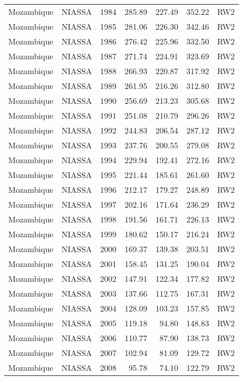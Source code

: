 \begin{longtable}{lllrrrl}
  Mozambique & NIASSA & 1984 & 285.89 & 227.49 & 352.22 & RW2 \\ 
  Mozambique & NIASSA & 1985 & 281.06 & 226.30 & 342.46 & RW2 \\ 
  Mozambique & NIASSA & 1986 & 276.42 & 225.96 & 332.50 & RW2 \\ 
  Mozambique & NIASSA & 1987 & 271.74 & 224.91 & 323.69 & RW2 \\ 
  Mozambique & NIASSA & 1988 & 266.93 & 220.87 & 317.92 & RW2 \\ 
  Mozambique & NIASSA & 1989 & 261.95 & 216.26 & 312.80 & RW2 \\ 
  Mozambique & NIASSA & 1990 & 256.69 & 213.23 & 305.68 & RW2 \\ 
  Mozambique & NIASSA & 1991 & 251.08 & 210.79 & 296.26 & RW2 \\ 
  Mozambique & NIASSA & 1992 & 244.83 & 206.54 & 287.12 & RW2 \\ 
  Mozambique & NIASSA & 1993 & 237.76 & 200.55 & 279.08 & RW2 \\ 
  Mozambique & NIASSA & 1994 & 229.94 & 192.41 & 272.16 & RW2 \\ 
  Mozambique & NIASSA & 1995 & 221.44 & 185.61 & 261.60 & RW2 \\ 
  Mozambique & NIASSA & 1996 & 212.17 & 179.27 & 248.89 & RW2 \\ 
  Mozambique & NIASSA & 1997 & 202.16 & 171.64 & 236.29 & RW2 \\ 
  Mozambique & NIASSA & 1998 & 191.56 & 161.71 & 226.13 & RW2 \\ 
  Mozambique & NIASSA & 1999 & 180.62 & 150.17 & 216.24 & RW2 \\ 
  Mozambique & NIASSA & 2000 & 169.37 & 139.38 & 203.51 & RW2 \\ 
  Mozambique & NIASSA & 2001 & 158.45 & 131.25 & 190.04 & RW2 \\ 
  Mozambique & NIASSA & 2002 & 147.91 & 122.34 & 177.82 & RW2 \\ 
  Mozambique & NIASSA & 2003 & 137.66 & 112.75 & 167.31 & RW2 \\ 
  Mozambique & NIASSA & 2004 & 128.09 & 103.23 & 157.85 & RW2 \\ 
  Mozambique & NIASSA & 2005 & 119.18 & 94.80 & 148.83 & RW2 \\ 
  Mozambique & NIASSA & 2006 & 110.77 & 87.90 & 138.73 & RW2 \\ 
  Mozambique & NIASSA & 2007 & 102.94 & 81.09 & 129.72 & RW2 \\ 
  Mozambique & NIASSA & 2008 & 95.78 & 74.10 & 122.79 & RW2 \\ 

\end{longtable}
